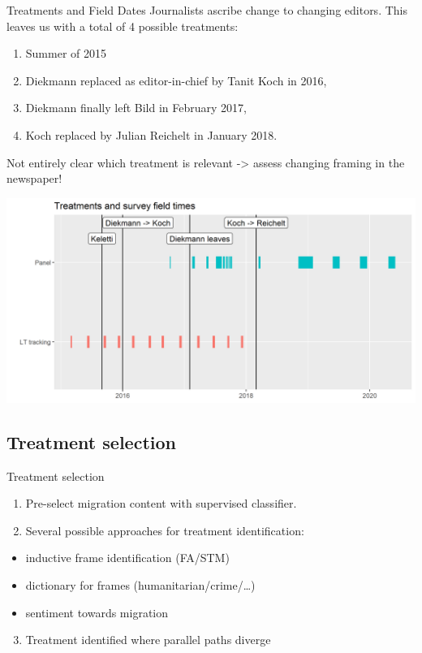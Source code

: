 \documentclass[
  ignorenonframetext,
]{beamer}
\providecommand{\tightlist}{%
  \setlength{\itemsep}{0pt}\setlength{\parskip}{0pt}}
\begin{document}
\begin{frame}[allowframebreaks]{Treatments and Field Dates}
Journalists ascribe change to changing editors. This leaves us with a
total of 4 possible treatments:

\begin{enumerate}
\tightlist
\item
  Summer of 2015
\item
  Diekmann replaced as editor-in-chief by Tanit Koch in 2016,
\item
  Diekmann finally left Bild in February 2017,
\item
  Koch replaced by Julian Reichelt in January 2018.
\end{enumerate}

Not entirely clear which treatment is relevant -\textgreater{} assess
changing framing in the newspaper!

\framebreak

\includegraphics{vis/gles_treatments.png}
\end{frame}

\hypertarget{treatment-selection}{%
\subsection{Treatment selection}\label{treatment-selection}}

\begin{frame}{Treatment selection}
\begin{enumerate}
\item
  Pre-select migration content with supervised classifier.
\item
  Several possible approaches for treatment identification:
\end{enumerate}

\begin{itemize}
\tightlist
\item
  inductive frame identification (FA/STM)
\item
  dictionary for frames (humanitarian/crime/\ldots)
\item
  sentiment towards migration
\end{itemize}

\begin{enumerate}
\setcounter{enumi}{2}
\tightlist
\item
  Treatment identified where parallel paths diverge
\end{enumerate}
\end{frame}
\end{document}
